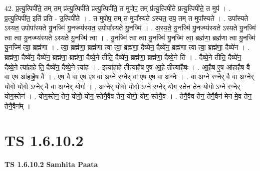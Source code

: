 \documentclass[17pt]{extarticle}
\begin{document}
42. प्र॒त्यु॒त्पिपी॑ते॒ तम् तम् प्र॑त्यु॒त्पिपी॑ते प्रत्यु॒त्पिपी॑ते॒ त मुपोप॒ तम् प्र॑त्यु॒त्पिपी॑ते प्रत्यु॒त्पिपी॑ते॒ त मुप॑ । . प्र॒त्यु॒त्पिपी॑त॒ इति॑ प्रति - उ॒त्पिपी॑ते । . त मुपोप॒ तम् त मुपा᳚स्यते ऽस्यत॒ उप॒ तम् त मुपा᳚स्यते । . उपा᳚स्यते ऽस्यत॒ उपोपा᳚स्यते यु॒नज्मि॑ यु॒नज्म्य॑स्यत॒ उपोपा᳚स्यते यु॒नज्मि॑ । . अ॒स्य॒ते॒ यु॒नज्मि॑ यु॒नज्म्य॑स्यते ऽस्यते यु॒नज्मि॑ त्वा त्वा यु॒नज्म्य॑स्यते ऽस्यते यु॒नज्मि॑ त्वा । . यु॒नज्मि॑ त्वा त्वा यु॒नज्मि॑ यु॒नज्मि॑ त्वा॒ ब्रह्म॑णा॒ ब्रह्म॑णा त्वा यु॒नज्मि॑ यु॒नज्मि॑ त्वा॒ ब्रह्म॑णा । . त्वा॒ ब्रह्म॑णा॒ ब्रह्म॑णा त्वा त्वा॒ ब्रह्म॑णा॒ दैव्ये॑न॒ दैव्ये॑न॒ ब्रह्म॑णा त्वा त्वा॒ ब्रह्म॑णा॒ दैव्ये॑न । . ब्रह्म॑णा॒ दैव्ये॑न॒ दैव्ये॑न॒ ब्रह्म॑णा॒ ब्रह्म॑णा॒ दैव्ये॒ने तीति॒ दैव्ये॑न॒ ब्रह्म॑णा॒ ब्रह्म॑णा॒ दैव्ये॒ने ति॑ । . दैव्ये॒ने तीति॒ दैव्ये॑न॒ दैव्ये॒ने त्या॑हा॒हे ति॒ दैव्ये॑न॒ दैव्ये॒ने त्या॑ह । . इत्या॑हा॒हे तीत्या॑है॒ष ए॒ष आ॒हे तीत्या॑है॒षः । . आ॒है॒ष ए॒ष आ॑हाहै॒ष वै वा ए॒ष आ॑हाहै॒ष वै । . ए॒ष वै वा ए॒ष ए॒ष वा अ॒ग्ने र॒ग्नेर् वा ए॒ष ए॒ष वा अ॒ग्नेः । . वा अ॒ग्ने र॒ग्नेर् वै वा अ॒ग्नेर् योगो॒ योगो॒ ऽग्नेर् वै वा अ॒ग्नेर् योगः॑ । . अ॒ग्नेर् योगो॒ योगो॒ ऽग्ने र॒ग्नेर् योग॒ स्तेन॒ तेन॒ योगो॒ ऽग्ने र॒ग्नेर् योग॒स्तेन॑ । . योग॒स्तेन॒ तेन॒ योगो॒ योग॒ स्तेनै॒वैव तेन॒ योगो॒ योग॒ स्तेनै॒व । . तेनै॒वैव तेन॒ तेनै॒वैन॑ मेन मे॒व तेन॒ तेनै॒वैन᳚म् । \newline
\pagebreak
{}

\section{ TS 1.6.10.2 }

\textbf{TS 1.6.10.2 } \newline
\textbf{Samhita Paata} \newline
\end{document}
